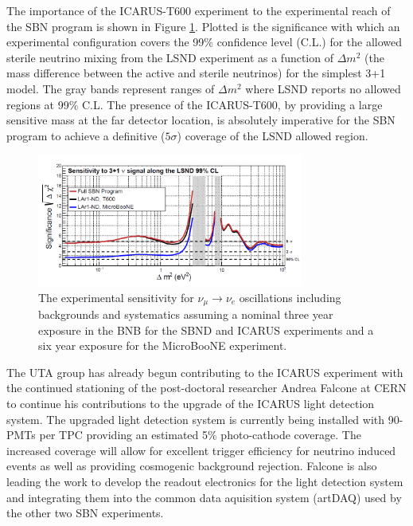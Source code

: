 The importance of the ICARUS-T600 experiment to the experimental reach of the SBN program is shown in Figure \ref{fig:sense}. Plotted is the significance with which an experimental configuration covers the 99$\%$ confidence level (C.L.) for the allowed sterile neutrino mixing from the LSND experiment as a function of $\Delta m^{2}$ (the mass difference between the active and sterile neutrinos) for the simplest 3+1 model. The gray bands represent ranges of $\Delta m^{2}$ where LSND reports no allowed regions at 99$\%$ C.L. The presence of the ICARUS-T600, by providing a large sensitive mass at the far detector location, is absolutely imperative for the SBN program to achieve a definitive ($5\sigma$) coverage of the LSND allowed region.

\begin{figure}[htb]
\centering
\includegraphics[width=0.78\textwidth]{images/Sensitivity.png}
\caption[]{The experimental sensitivity for $\nu_{\mu} \rightarrow \nu_{e}$ oscillations including backgrounds and systematics assuming a nominal three year exposure in the BNB for the SBND and ICARUS experiments and a six year exposure for the MicroBooNE experiment.}
\label{fig:sense}
\end{figure}


The UTA group has already begun contributing to the ICARUS experiment with the continued stationing of the post-doctoral researcher Andrea Falcone at CERN to continue his contributions to the upgrade of the ICARUS light detection system. The upgraded light detection system is currently being installed with 90-PMTs per TPC providing an estimated 5$\%$ photo-cathode coverage. The increased coverage will allow for excellent trigger efficiency for neutrino induced events as well as providing cosmogenic background rejection. Falcone is also leading the work to develop the readout electronics for the light detection system and integrating them into the common data aquisition system (artDAQ) used by the other two SBN experiments.


